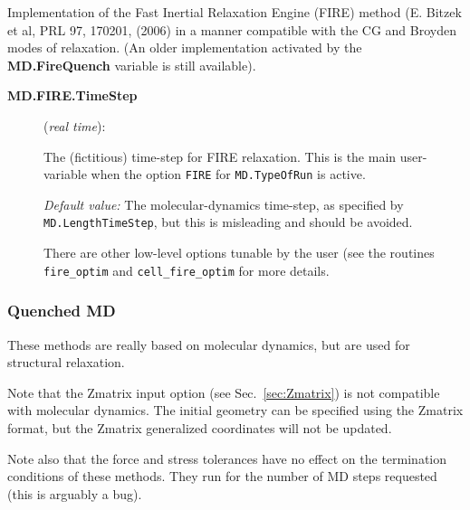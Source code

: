 Implementation of the  Fast Inertial Relaxation
Engine (FIRE) method (E. Bitzek et al, PRL 97, 170201, (2006) in a
manner compatible with the CG and Broyden modes of relaxation. (An
older implementation activated by the \textbf{MD.FireQuench} variable is
still available).

\begin{description}
\item[\textbf{MD.FIRE.TimeStep}] (\textit{real time}):

The (fictitious) time-step for FIRE relaxation.
This is the main user-variable
when the option \texttt{FIRE} for \texttt{MD.TypeOfRun} is active.

\textit{Default value:} The molecular-dynamics time-step, as
specified by \texttt{MD.LengthTimeStep}, but this is misleading and
should be avoided.

There are other low-level options tunable by the user (see the
routines \texttt{fire\_optim} and \texttt{cell\_fire\_optim} for more details.

\end{description}

\subsubsection{Quenched MD}

These methods are really based on molecular dynamics, but are used for
structural relaxation.

Note that the Zmatrix input option (see
Sec.~\ref{sec:Zmatrix}) is not compatible with molecular dynamics. The
initial geometry can be specified using the Zmatrix format, but the
Zmatrix generalized coordinates will not be updated.

Note also that the force and stress tolerances have no effect on
the termination conditions of these methods. They run for the number
of MD steps requested (this is arguably a bug).


